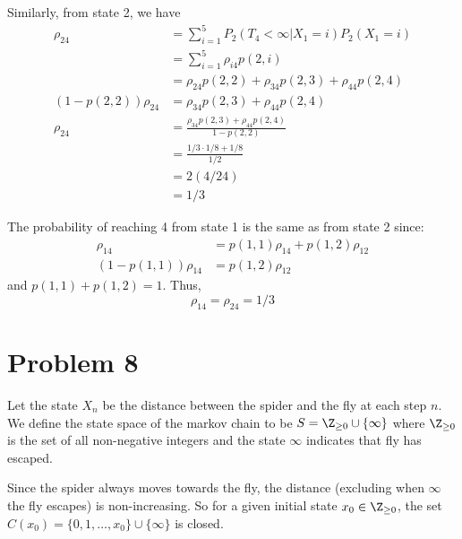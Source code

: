\documentclass{homework}
\begin{document}
\begin{letterenum}
Similarly, from state 2, we have
\begin{align*}
    \rho_{24} &= \sum_{i=1}^{5} P_2(T_4 < \infty | X_1 = i) P_2(X_1 = i) \\
        &= \sum_{i=1}^5 \rho_{i4} p(2, i) \\
        &= \rho_{24} p(2, 2) + \rho_{34} p(2, 3) + \rho_{44} p(2, 4) \\
    (1 - p(2, 2))\rho_{24} &= \rho_{34} p(2, 3) + \rho_{44} p(2, 4) \\
    \rho_{24} &= \frac{\rho_{34} p(2, 3) + \rho_{44} p(2, 4)}{1 - p(2, 2)} \\
        &= \frac{1/3 \cdot 1/8 + 1/8}{1/2} \\
        &= 2 (4 / 24) \\
        &= 1/3
\end{align*}

The probability of reaching 4 from state 1 is the same as from state 2
since:
\begin{align*}
    \rho_{14} &= p(1, 1) \rho_{14} + p(1, 2) \rho_{12} \\
    (1 - p(1, 1)) \rho_{14} &= p(1, 2) \rho_{12}
\end{align*}
and $p(1, 1) + p(1, 2) = 1$. Thus,
\begin{equation*}
    \rho_{14} = \rho_{24} = 1/3
\end{equation*}

\end{letterenum}

\section{Problem 8}
Let the state $X_n$ be the distance between the spider and the fly
at each step $n$.
We define the state space of the markov chain to be $S = \Z_{\geq 0} \cup \{\infty\}$
where $\Z_{\geq 0}$ is the set of all non-negative integers and the state
$\infty$ indicates that fly has escaped.

Since the spider always moves towards the fly, the distance (excluding when $\infty$
the fly escapes) is non-increasing. So for a given initial state $x_0\in\Z_{\geq 0}$,
the set $C(x_0) = \{0, 1, \dots, x_0\} \cup \{\infty\}$ is closed.
\end{document}
